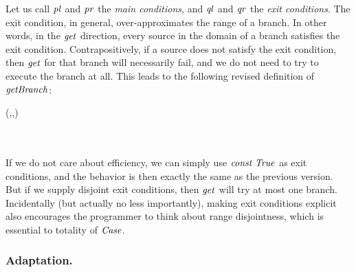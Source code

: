 Let us call \ensuremath{\Varid{pl}} and \ensuremath{\Varid{pr}} the \emph{main conditions}, and \ensuremath{\Varid{ql}} and \ensuremath{\Varid{qr}} the \emph{exit conditions}.
The exit condition, in general, over-approximates the range of a branch.
In other words, in the \ensuremath{\Varid{get}} direction, every source in the domain of a branch satisfies the exit condition.
Contrapositively, if a source does not satisfy the exit condition, then \ensuremath{\Varid{get}} for that branch will necessarily fail, and we do not need to try to execute the branch at all.
This leads to the following revised definition of \ensuremath{\Varid{getBranch}}:
\begin{hscode}\SaveRestoreHook
{}%
%
%
%
%
%
%
\>[B]{}\;(,,)\;\mathrel{=}\;\;\;{}\<[36]%
\>[36]{}\;{}\<[42]%
\>[42]{}\;{}\<[46]%
\>[46]{}\leftarrow {}\;\;\<[E]%
\\
\>[46]{}\;\;\;\;{}\<[57]%
\>[57]{}\;{}\<[63]%
\>[63]{}\;\<[E]%
\\
\>[57]{}\;{}\<[63]%
\>[63]{}\<[E]%
\\
\>[36]{}\;{}\<[42]%
\>[42]{}\<[E]%
\ColumnHook
\end{hscode}\resethooks
If we do not care about efficiency, we can simply use \ensuremath{\Varid{const}\;\Conid{True}} as exit conditions, and the behavior is then exactly the same as the previous version.
But if we supply disjoint exit conditions, then \ensuremath{\Varid{get}} will try at most one branch.
Incidentally (but actually no less importantly), making exit conditions explicit also encourages the programmer to think about range disjointness, which is essential to totality of \ensuremath{\Conid{Case}}.

\subsubsection{Adaptation.}

